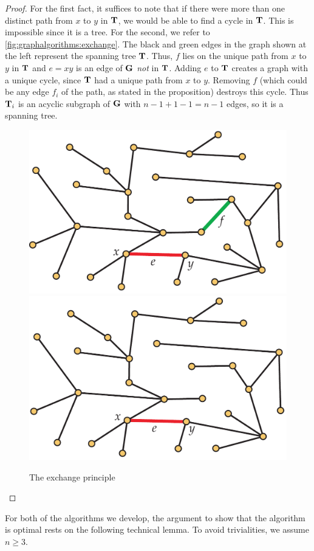 \begin{proof}
  For the first fact, it suffices to note that if there were more than
  one distinct path from $x$ to $y$ in $\mathbf{T}$, we would be able to
  find a cycle in $\mathbf{T}$. This is impossible since it is a tree. For
  the second, we refer to \autoref{fig:graphalgorithms:exchange}. The
  black and green edges in the graph shown at the left represent the
  spanning tree $\mathbf{T}$. Thus, $f$ lies on the unique path from $x$ to
  $y$ in $\mathbf{T}$ and $e=xy$ is an edge of $\mathbf{G}$ \emph{not} in
  $\mathbf{T}$. Adding $e$ to $\mathbf{T}$ creates a graph with a unique cycle,
  since $\mathbf{T}$ had a unique path from $x$ to $y$. Removing $f$ (which
  could be any edge $f_i$ of the path, as stated in the proposition)
  destroys this cycle. Thus $\mathbf{T}_i$ is an acyclic subgraph of $\mathbf{G}$
  with $n-1+1-1=n-1$ edges, so it is a spanning tree.
  \begin{figure}[h]
    \centering
    \includegraphics[width=0.45\linewidth]{graphalgorithms-figs/exchange1}\hspace{0.05\linewidth}\includegraphics[width=0.45\linewidth]{graphalgorithms-figs/exchange2}
    \caption{The exchange principle}
    \label{fig:graphalgorithms:exchange}
  \end{figure}
\end{proof}
 
For both of the algorithms we develop, the argument to show that the
algorithm is optimal rests on the following technical lemma.  To avoid
trivialities, we assume $n\ge3$.

